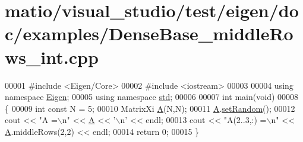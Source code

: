 \hypertarget{matio_2visual__studio_2test_2eigen_2doc_2examples_2_dense_base__middle_rows__int_8cpp_source}{}\section{matio/visual\+\_\+studio/test/eigen/doc/examples/\+Dense\+Base\+\_\+middle\+Rows\+\_\+int.cpp}
\label{matio_2visual__studio_2test_2eigen_2doc_2examples_2_dense_base__middle_rows__int_8cpp_source}

\begin{DoxyCode}
00001 \textcolor{preprocessor}{#include <Eigen/Core>}
00002 \textcolor{preprocessor}{#include <iostream>}
00003 
00004 \textcolor{keyword}{using namespace }\hyperlink{namespace_eigen}{Eigen};
00005 \textcolor{keyword}{using namespace }\hyperlink{namespacestd}{std};
00006 
00007 \textcolor{keywordtype}{int} main(\textcolor{keywordtype}{void})
00008 \{
00009     \textcolor{keywordtype}{int} \textcolor{keyword}{const} N = 5;
00010     MatrixXi \hyperlink{group___core___module_class_eigen_1_1_matrix}{A}(N,N);
00011     \hyperlink{group___core___module_class_eigen_1_1_matrix}{A}.\hyperlink{class_eigen_1_1_plain_object_base_af0e576a0e1aefc9ee346de44cc352ba3}{setRandom}();
00012     cout << \textcolor{stringliteral}{"A =\(\backslash\)n"} << \hyperlink{group___core___module_class_eigen_1_1_matrix}{A} << \textcolor{charliteral}{'\(\backslash\)n'} << endl;
00013     cout << \textcolor{stringliteral}{"A(2..3,:) =\(\backslash\)n"} << \hyperlink{group___core___module_class_eigen_1_1_matrix}{A}.middleRows(2,2) << endl;
00014     \textcolor{keywordflow}{return} 0;
00015 \}
\end{DoxyCode}
